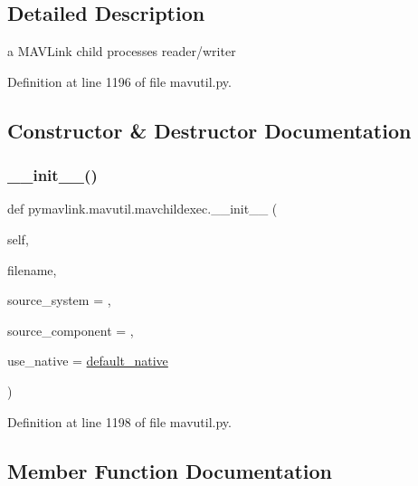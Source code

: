 \subsection{Detailed Description}
\begin{DoxyVerb}a MAVLink child processes reader/writer\end{DoxyVerb}
 

Definition at line 1196 of file mavutil.\+py.



\subsection{Constructor \& Destructor Documentation}
\mbox{\label{classpymavlink_1_1mavutil_1_1mavchildexec_a22c046b50111af6b46e66e3db0dc200f}} 
\subsubsection{\texorpdfstring{\_\_init\_\_()}{\_\_init\_\_()}}
{\footnotesize\ttfamily def pymavlink.\+mavutil.\+mavchildexec.\+\_\+\+\_\+init\+\_\+\+\_\+ (\begin{DoxyParamCaption}\item[{}]{self,  }\item[{}]{filename,  }\item[{}]{source\+\_\+system = {},  }\item[{}]{source\+\_\+component = {},  }\item[{}]{use\+\_\+native = {\ttfamily \mbox{\hyperlink{namespacepymavlink_1_1mavutil_a21ce9da7b698a7bc21c44b9f77341b62}{default\+\_\+native}}} }\end{DoxyParamCaption})}



Definition at line 1198 of file mavutil.\+py.



\subsection{Member Function Documentation}
\mbox{\label{classpymavlink_1_1mavutil_1_1mavchildexec_ae42ec30dccc050e0b632847b4d47934a}} 
